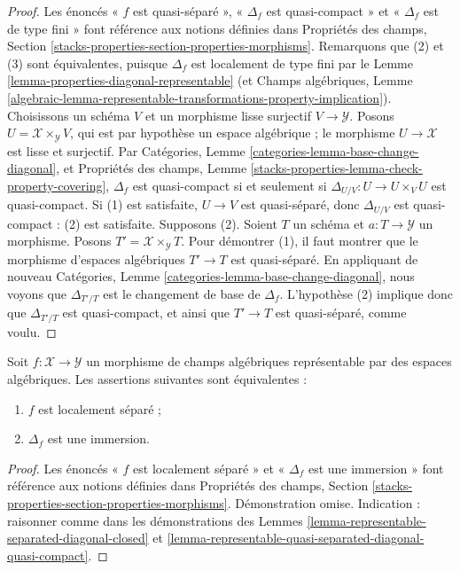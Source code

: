 \begin{proof}
Les énoncés « $f$ est quasi-séparé », « $\Delta_f$ est quasi-compact » et
« $\Delta_f$ est de type fini » font référence aux notions définies dans
Propriétés des champs,
Section \ref{stacks-properties-section-properties-morphisms}. Remarquons que
(2) et (3) sont équivalentes, puisque $\Delta_f$ est localement de type fini
par le Lemme \ref{lemma-properties-diagonal-representable} (et Champs
algébriques, Lemme
\ref{algebraic-lemma-representable-transformations-property-implication}).
Choisissons un schéma $V$ et un morphisme lisse surjectif
$V\to\mathcal{Y}$. Posons $U=\mathcal{X}\times_\mathcal{Y}V$, qui est par
hypothèse un espace algébrique ; le morphisme $U\to\mathcal{X}$ est lisse et
surjectif. Par Catégories, Lemme
\ref{categories-lemma-base-change-diagonal}, et Propriétés des champs, Lemme
\ref{stacks-properties-lemma-check-property-covering}, $\Delta_f$ est
quasi-compact si et seulement si
$\Delta_{U/V}:U\to U\times_VU$ est quasi-compact. Si (1) est satisfaite,
$U\to V$ est quasi-séparé, donc $\Delta_{U/V}$ est quasi-compact : (2) est
satisfaite. Supposons (2). Soient $T$ un schéma et
$a:T\to\mathcal{Y}$ un morphisme. Posons
$T'=\mathcal{X}\times_\mathcal{Y}T$. Pour démontrer (1), il faut montrer que
le morphisme d'espaces algébriques $T'\to T$ est quasi-séparé. En appliquant
de nouveau Catégories, Lemme \ref{categories-lemma-base-change-diagonal}, nous
voyons que $\Delta_{T'/T}$ est le changement de base de $\Delta_f$.
L'hypothèse (2) implique donc que $\Delta_{T'/T}$ est quasi-compact, et ainsi
que $T'\to T$ est quasi-séparé, comme voulu.
\end{proof}

\begin{lemma}
\label{lemma-representable-locally-separated-diagonal-immersion}
Soit $f:\mathcal{X}\to\mathcal{Y}$ un morphisme de champs algébriques
représentable par des espaces algébriques. Les assertions suivantes sont
équivalentes :
\begin{enumerate}
\item $f$ est localement séparé ;
\item $\Delta_f$ est une immersion.
\end{enumerate}
\end{lemma}

\begin{proof}
Les énoncés « $f$ est localement séparé » et « $\Delta_f$ est une immersion »
font référence aux notions définies dans Propriétés des champs,
Section \ref{stacks-properties-section-properties-morphisms}.
Démonstration omise. Indication : raisonner comme dans les démonstrations des
Lemmes \ref{lemma-representable-separated-diagonal-closed} et
\ref{lemma-representable-quasi-separated-diagonal-quasi-compact}.
\end{proof}






